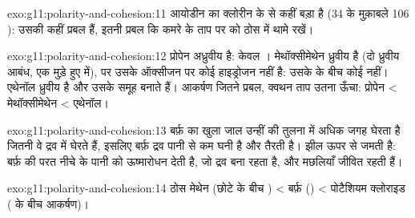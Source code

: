\begin{solution}{exo:g11:polarity-and-cohesion:11}
आयोडीन का  क्लोरीन के  से कहीं बड़ा है (34 के मुक़ाबले 106
): उसकी  कहीं प्रबल हैं,
इतनी प्रबल कि कमरे के ताप पर  को ठोस में थामे रखें।
\end{solution}

\begin{solution}{exo:g11:polarity-and-cohesion:12}
प्रोपेन अध्रुवीय है: केवल । मेथॉक्सीमेथेन
ध्रुवीय है (दो ध्रुवीय  आबंध, एक मुड़े हुए  में), पर उसके ऑक्सीजन पर
कोई हाइड्रोजन नहीं है: उसके  के बीच कोई  नहीं। एथेनॉल
ध्रुवीय है और उसके  समूह  बनाते हैं। आकर्षण जितने प्रबल,
क्वथन ताप उतना ऊँचा: प्रोपेन < मेथॉक्सीमेथेन
< एथेनॉल।
\end{solution}

\begin{solution}{exo:g11:polarity-and-cohesion:13}
बर्फ़ का खुला जाल उन्हीं  की तुलना में अधिक जगह घेरता है जितनी वे द्रव में
घेरते हैं, इसलिए बर्फ़ द्रव पानी से कम घनी है और तैरती है। झील ऊपर से जमती
है: बर्फ़ की परत नीचे के पानी को ऊष्मारोधन देती है, जो
द्रव बना रहता है, और मछलियाँ जीवित रहती हैं।
\end{solution}

\begin{solution}{exo:g11:polarity-and-cohesion:14}
ठोस मेथेन (छोटे  के बीच ) <
बर्फ़ () < पोटैशियम क्लोराइड ( के बीच आकर्षण)।
\end{solution}

